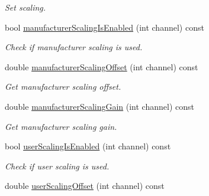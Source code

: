 \begin{DoxyCompactItemize}
\begin{DoxyCompactList}\small\item\em Set scaling. \end{DoxyCompactList}\item 
\hypertarget{classmdt_device_modbus_wago_module_rtd_a1e2cc22d3edb80b4f086575adea75e6b}{
bool \hyperlink{classmdt_device_modbus_wago_module_rtd_a1e2cc22d3edb80b4f086575adea75e6b}{manufacturerScalingIsEnabled} (int channel) const }
\label{classmdt_device_modbus_wago_module_rtd_a1e2cc22d3edb80b4f086575adea75e6b}

\begin{DoxyCompactList}\small\item\em Check if manufacturer scaling is used. \end{DoxyCompactList}\item 
\hypertarget{classmdt_device_modbus_wago_module_rtd_aa0b24b290c75132ccf6a964b51b9c8c4}{
double \hyperlink{classmdt_device_modbus_wago_module_rtd_aa0b24b290c75132ccf6a964b51b9c8c4}{manufacturerScalingOffset} (int channel) const }
\label{classmdt_device_modbus_wago_module_rtd_aa0b24b290c75132ccf6a964b51b9c8c4}

\begin{DoxyCompactList}\small\item\em Get manufacturer scaling offset. \end{DoxyCompactList}\item 
\hypertarget{classmdt_device_modbus_wago_module_rtd_a39989cd76ae2195d0dec147ca128a96a}{
double \hyperlink{classmdt_device_modbus_wago_module_rtd_a39989cd76ae2195d0dec147ca128a96a}{manufacturerScalingGain} (int channel) const }
\label{classmdt_device_modbus_wago_module_rtd_a39989cd76ae2195d0dec147ca128a96a}

\begin{DoxyCompactList}\small\item\em Get manufacturer scaling gain. \end{DoxyCompactList}\item 
\hypertarget{classmdt_device_modbus_wago_module_rtd_a6144f959f5ecb425d1526871ef99a4d0}{
bool \hyperlink{classmdt_device_modbus_wago_module_rtd_a6144f959f5ecb425d1526871ef99a4d0}{userScalingIsEnabled} (int channel) const }
\label{classmdt_device_modbus_wago_module_rtd_a6144f959f5ecb425d1526871ef99a4d0}

\begin{DoxyCompactList}\small\item\em Check if user scaling is used. \end{DoxyCompactList}\item 
\hypertarget{classmdt_device_modbus_wago_module_rtd_a0a1c2980fe4b3b0fb774b1f41280d890}{
double \hyperlink{classmdt_device_modbus_wago_module_rtd_a0a1c2980fe4b3b0fb774b1f41280d890}{userScalingOffset} (int channel) const }
\label{classmdt_device_modbus_wago_module_rtd_a0a1c2980fe4b3b0fb774b1f41280d890}


\end{DoxyCompactItemize}
